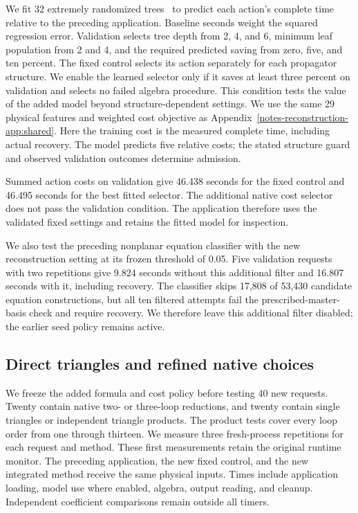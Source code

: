 We fit 32 extremely randomized trees~\cite{Geurts2006ExtraTrees} to predict each action's complete time relative to the preceding application. Baseline seconds weight the squared regression error. Validation selects tree depth from 2, 4, and 6, minimum leaf population from 2 and 4, and the required predicted saving from zero, five, and ten percent. The fixed control selects its action separately for each propagator structure. We enable the learned selector only if it saves at least three percent on validation and selects no failed algebra procedure. This condition tests the value of the added model beyond structure-dependent settings. We use the same 29 physical features and weighted cost objective as Appendix~\ref{notes-reconstruction-app:shared}. Here the training cost is the measured complete time, including actual recovery. The model predicts five relative costs; the stated structure guard and observed validation outcomes determine admission.

Summed action costs on validation give 46.438 seconds for the fixed control and 46.495 seconds for the best fitted selector. The additional native cost selector does not pass the validation condition. The application therefore uses the validated fixed settings and retains the fitted model for inspection.

We also test the preceding nonplanar equation classifier with the new reconstruction setting at its frozen threshold of 0.05. Five validation requests with two repetitions give 9.824 seconds without this additional filter and 16.807 seconds with it, including recovery. The classifier skips 17,808 of 53,430 candidate equation constructions, but all ten filtered attempts fail the prescribed-master-basis check and require recovery. We therefore leave this additional filter disabled; the earlier seed policy remains active.
\subsection{Direct triangles and refined native choices}
\label{notes-triangle:sec:triangle-results}
We freeze the added formula and cost policy before testing 40 new requests. Twenty contain native two- or three-loop reductions, and twenty contain single triangles or independent triangle products. The product tests cover every loop order from one through thirteen. We measure three fresh-process repetitions for each request and method. These first measurements retain the original runtime monitor. The preceding application, the new fixed control, and the new integrated method receive the same physical inputs. Times include application loading, model use where enabled, algebra, output reading, and cleanup. Independent coefficient comparisons remain outside all timers.

